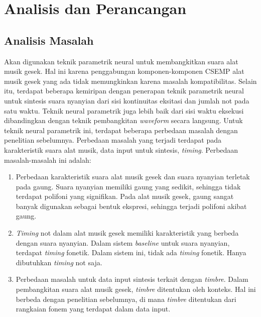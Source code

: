 \chapter{Analisis dan Perancangan} \label{design-chapter}

\section{Analisis Masalah}\label{section-problem-analysis}

Akan digunakan teknik parametrik neural untuk membangkitkan suara alat musik gesek. Hal ini karena penggabungan komponen-komponen CSEMP alat musik gesek yang ada tidak memungkinkan karena masalah kompatibilitas. Selain itu, terdapat beberapa kemiripan dengan penerapan teknik parametrik neural untuk sintesis suara nyanyian dari sisi kontinuitas eksitasi dan jumlah not pada satu waktu. Teknik neural parametrik juga lebih baik dari sisi waktu eksekusi dibandingkan dengan teknik pembangkitan \textit{waveform} secara langsung. Untuk teknik neural parametrik ini, terdapat beberapa perbedaan masalah dengan penelitian sebelumnya\parencite{bonada2017singing}. Perbedaan masalah yang terjadi terdapat pada karakteristik suara alat musik, data input untuk sintesis, \textit{timing}. Perbedaan masalah-masalah ini adalah:

\begin{enumerate}

\item Perbedaan karakteristik suara alat musik gesek dan suara nyanyian terletak pada gaung. Suara nyanyian memiliki gaung yang sedikit, sehingga tidak terdapat polifoni yang signifikan. Pada alat musik gesek, gaung sangat banyak digunakan sebagai bentuk ekspresi, sehingga terjadi polifoni akibat gaung.

\item \textit{Timing} not dalam alat musik gesek memiliki karakteristik yang berbeda dengan suara nyanyian. Dalam sistem \textit{baseline} untuk suara nyanyian, terdapat \textit{timing} fonetik. Dalam sistem ini, tidak ada \textit{timing} fonetik. Hanya dibutuhkan \textit{timing} not saja.

\item Perbedaan masalah untuk data input sintesis terkait dengan \textit{timbre}. Dalam pembangkitan suara alat musik gesek, \textit{timbre} ditentukan oleh konteks. Hal ini berbeda dengan penelitian sebelumnya, di mana \textit{timbre} ditentukan dari rangkaian fonem yang terdapat dalam data input.

\end{enumerate}

